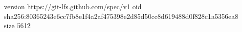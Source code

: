 version https://git-lfs.github.com/spec/v1
oid sha256:80365243e6cc7fb8e1f4a2af475398e2d85d50cc8d619488d0f828c1a5356ea8
size 5612
